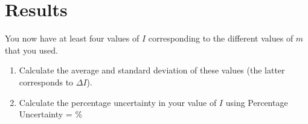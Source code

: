 \section{Results}

    You now have at least four values of $I$ corresponding to the different values of $m$ that you used.

    \begin{enumerate}

        \item Calculate the average and standard deviation of these values (the latter corresponds to $\Delta I$).

        \item Calculate the percentage uncertainty in your value of $I$ using
                \beq
                    \textrm{Percentage Uncertainty} =   \%
                \eeq
    \end{enumerate}
